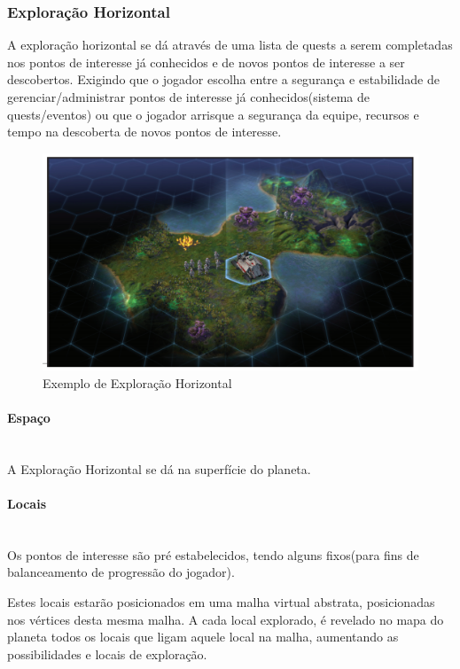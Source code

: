 \documentclass[11pt]{article} %
\begin{document}
\newpage

\subsubsection{Exploração Horizontal}
A exploração horizontal se dá através de uma lista de quests a serem completadas nos pontos de interesse já conhecidos e de novos pontos de interesse a ser descobertos. Exigindo que o jogador escolha entre a segurança e estabilidade de gerenciar/administrar pontos de interesse já conhecidos(sistema de quests/eventos) ou que o jogador arrisque a segurança da equipe, recursos e tempo na descoberta de novos pontos de interesse.

\begin{figure}[!htp]
\centering
\includegraphics[scale=0.3]{res/resources.png}
\caption{Exemplo de Exploração Horizontal}
\label{Exemplo de Exploração Horizontal}
\end{figure}

\paragraph{Espaço} \mbox{}\\
A Exploração Horizontal se dá na superfície do planeta.
\paragraph{Locais} \mbox{}\\
Os pontos de interesse são pré estabelecidos, tendo alguns fixos(para fins de balanceamento de progressão do jogador).

Estes locais estarão posicionados em uma malha virtual abstrata, posicionadas nos vértices desta mesma malha. A cada local explorado, é revelado no mapa do planeta todos os locais que ligam aquele local na malha, aumentando as possibilidades e locais de exploração.
\end{document}
